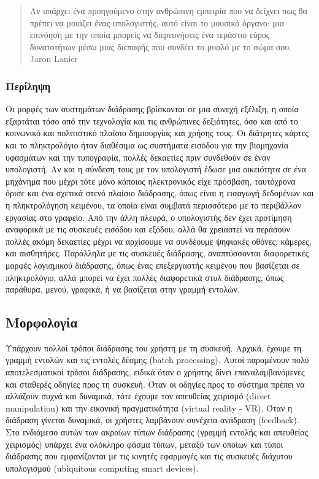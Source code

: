 \documentclass[
]{article}
\begin{document}
\begin{quote}
Αν υπάρχει ένα προηγούμενο στην ανθρώπινη εμπειρία που να δείχνει πως θα
πρέπει να μοιάζει ένας υπολογιστής, αυτό είναι το μουσικό όργανο: μια
επινόηση με την οποία μπορείς να διερευνήσεις ένα τεράστιο εύρος
δυνατοτήτων μέσω μιας διεπαφής που συνδέει το μυαλό με το σώμα σου.
Jaron Lanier
\end{quote}

\hypertarget{ux3c0ux3b5ux3c1ux3afux3bbux3b7ux3c8ux3b7}{%
\subsubsection{Περίληψη}\label{ux3c0ux3b5ux3c1ux3afux3bbux3b7ux3c8ux3b7}}

Οι μορφές των συστημάτων διάδρασης βρίσκονται σε μια συνεχή εξέλιξη, η
οποία εξαρτάται τόσο από την τεχνολογία και τις ανθρώπινες δεξιότητες,
όσο και από το κοινωνικό και πολιτιστικό πλαίσιο δημιουργίας και χρήσης
τους. Οι διάτρητες κάρτες και το πληκτρολόγιο ήταν διαθέσιμα ως
συστήματα εισόδου για την βιομηχανία υφασμάτων και την τυπογραφία,
πολλές δεκαετίες πριν συνδεθούν σε έναν υπολογιστή. Αν και η σύνδεση
τους με τον υπολογιστή έδωσε μια οικειότητα σε ένα μηχάνημα που μέχρι
τότε μόνο κάποιος ηλεκτρονικός είχε πρόσβαση, ταυτόχρονα όρισε και ένα
σχετικά στενό πλαίσιο διάδρασης, όπως είναι η εισαγωγή δεδομένων και η
πληκτρολόγηση κειμένου, τα οποία είναι συμβατά περισσότερο με το
περιβάλλον εργασίας στο γραφείο. Από την άλλη πλευρά, ο υπολογιστής δεν
έχει προτίμηση αναφορικά με τις συσκευές εισόδου και εξόδου, αλλά θα
χρειαστεί να περάσουν πολλές ακόμη δεκαετίες μέχρι να αρχίσουμε να
συνδέουμε ψηφιακές οθόνες, κάμερες, και αισθητήρες. Παράλληλα με τις
συσκευές διάδρασης, αναπτύσσονται διαφορετικές μορφές λογισμικού
διάδρασης, όπως ένας επεξεργαστής κειμένου που βασίζεται σε
πληκτρολόγιο, αλλά μπορεί να έχει πολλές διαφορετικά στυλ διάδρασης,
όπως παράθυρα, μενού, γραφικά, ή να βασίζεται στην γραμμή εντολών.

\hypertarget{ux3bcux3bfux3c1ux3c6ux3bfux3bbux3bfux3b3ux3afux3b1}{%
\subsection{Μορφολογία}\label{ux3bcux3bfux3c1ux3c6ux3bfux3bbux3bfux3b3ux3afux3b1}}

Υπάρχουν πολλοί τρόποι διάδρασης του χρήστη με τη συσκευή. Αρχικά,
έχουμε τη γραμμή εντολών και τις εντολές δέσμης (batch processing).
Αυτοί παραμένουν πολύ αποτελεσματικοί τρόποι διάδρασης, ειδικά όταν ο
χρήστης δίνει επαναλαμβανόμενες και σταθερές οδηγίες προς τη συσκευή.
Όταν οι οδηγίες προς το σύστημα πρέπει να αλλάζουν συχνά και δυναμικά,
τότε έχουμε τον απευθείας χειρισμό (direct manipulation) και την
εικονική πραγματικότητα (virtual reality - VR). Όταν η διάδραση γίνεται
δυναμικά, οι χρήστες λαμβάνουν συνέχεια ανάδραση (feedback). Στο
ενδιάμεσο αυτών των ακραίων τύπων διάδρασης (γραμμή εντολής και
απευθείας χειρισμός) υπάρχει ένα ολόκληρο φάσμα τύπων, μεταξύ των οποίων
και τύποι διάδρασης που εμφανίζονται με τις κινητές εφαρμογές και τις
συσκευές διάχυτου υπολογισμού (ubiquitous computing smart devices).
\end{document}
